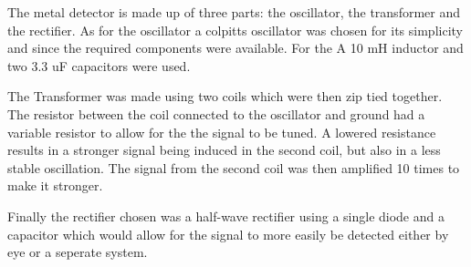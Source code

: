 % 
The metal detector is made up of three parts: the oscillator, the transformer and the rectifier.
As for the oscillator a colpitts oscillator was chosen for its simplicity and since the required components were available. 
For the A 10 mH inductor and two 3.3 uF capacitors were used.

The Transformer was made using two coils which were then zip tied together. The resistor between the coil connected to the oscillator 
and ground had a variable resistor to allow for the the signal to be tuned. A lowered resistance results in a stronger signal
 being induced in the second coil, but also in a less stable oscillation. The signal from the second coil was then amplified 10 times to make
 it stronger.

Finally the rectifier chosen was a  half-wave rectifier using a single diode and a capacitor which would allow for the signal to more 
easily be detected either by eye or a seperate system.